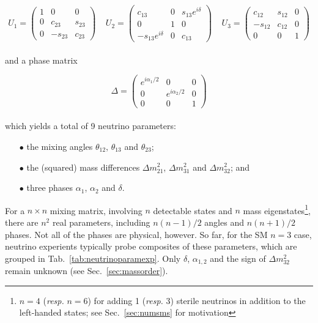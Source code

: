 \begin{equation}
U_1 = 
\left( 
\begin{array}{ccc}
1 & 0 & 0 \\
0 & c_{23} & s_{23} \\
0 & -s_{23} & c_{23}
\end{array}
\right)~~~~~
U_2 = 
\left( 
\begin{array}{ccc}
c_{13} & 0 & s_{13}e^{i \delta} \\
0 & 1 & 0 \\
- s_{13}e^{i \delta} & 0 & c_{13}
\end{array}
\right)~~~~~
U_3 = 
\left( 
\begin{array}{ccc}
c_{12} & s_{12} & 0 \\
- s_{12} & c_{12} & 0 \\
0 & 0 & 1
\end{array}
\right)
\end{equation} \\ and a phase matrix

\begin{equation}
\Delta = 
\left( 
\begin{array}{ccc}
e^{i \alpha_1 / 2} & 0 & 0 \\
0 & e^{i \alpha_2 / 2} & 0 \\
0 & 0 & 1
\end{array}
\right)
\end{equation} \\ which yields a total of 9 neutrino parameters: \\

\begin{itemize}
\item[$\bullet$] the mixing angles $\theta_{12}$, $\theta_{13}$ and $\theta_{23}$;
\item[$\bullet$] the (squared) mass differences $\Delta m^2_{21}$, $\Delta m^2_{31}$ and $\Delta m^2_{32}$; and
\item[$\bullet$] three phases $\alpha_1$, $\alpha_2$ and $\delta$.\\
\end{itemize} 
For a $n \times n$ mixing matrix, involving $n$ detectable states and $n$ mass eigenstates\footnote{$n=4$ (\textit{resp.} $n=6$) for adding 1 (\textit{resp.} 3) sterile neutrinos in addition to the left-handed states; see Sec.~\ref{sec:numsms} for motivation}, there are $n^2$ real parameters, including $n(n-1)/2$ angles and $n(n+1)/2$ phases. Not all of the phases are physical, however. So far, for the SM $n=3$ case, neutrino experients typically probe composites of these parameters, which are grouped in Tab.~\ref{tab:neutrinoparamexp}. Only $\delta$, $\alpha_{1,2}$ and the sign of $\Delta m^2_{32}$ remain unknown (see Sec.~\ref{sec:massorder}). \\


